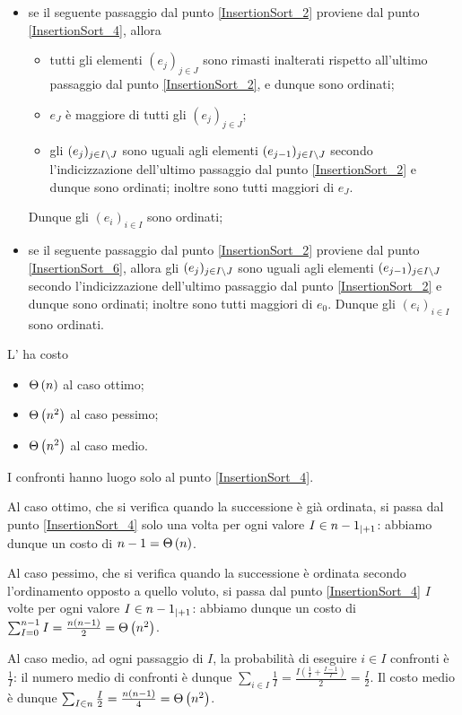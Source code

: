 \begin{itemize}
	\item se il seguente passaggio dal punto \ref{InsertionSort_2} proviene dal
    punto \ref{InsertionSort_4}, allora
	\begin{itemize}
		\item tutti gli elementi $(e_j)_{j \in J}$ sono rimasti inalterati rispetto
      all'ultimo passaggio dal punto \ref{InsertionSort_2}, e dunque sono
      ordinati;
		\item $e_J$ \`e maggiore di tutti gli $(e_j)_{j \in J}$;
		\item gli $(e_j)_{j \in I \setminus J}$ sono uguali agli elementi
      $(e_{j - 1})_{j \in I \setminus J}$ secondo l'indicizzazione dell'ultimo
      passaggio dal punto \ref{InsertionSort_2} e dunque sono ordinati; inoltre
      sono tutti maggiori di $e_J$.
	\end{itemize}
	Dunque gli $(e_i)_{i \in I}$ sono ordinati;
	\item se il seguente passaggio dal punto \ref{InsertionSort_2} proviene dal
    punto \ref{InsertionSort_6}, allora gli $(e_j)_{j \in I \setminus J}$ sono
    uguali agli elementi $(e_{j - 1})_{j \in I \setminus J}$ secondo
    l'indicizzazione dell'ultimo passaggio dal punto \ref{InsertionSort_2} e
    dunque sono ordinati; inoltre sono tutti maggiori di $e_0$. Dunque gli
    $(e_i)_{i \in I}$ sono ordinati. \EndProof
\end{itemize}
\begin{Theorem}
	L' ha costo
	\begin{itemize}
		\item $\Theta \left ( n \right )$ al caso ottimo;
		\item $\Theta \left ( n^2 \right )$ al caso pessimo;
		\item $\Theta \left ( n^2 \right )$ al caso medio.
	\end{itemize}
\end{Theorem}
\Proof I confronti hanno luogo solo al punto \ref{InsertionSort_4}.
\par Al caso ottimo, che si verifica quando la successione \`e gi\`a ordinata,
si passa dal punto \ref{InsertionSort_4} solo una volta per ogni valore
$I \in {n - 1}_{|+ 1}$: abbiamo dunque un costo di $n - 1 = \Theta \left ( n \right )$.
\par Al caso pessimo, che si verifica quando la successione \`e ordinata secondo
l'ordinamento opposto a quello voluto, si passa dal punto \ref{InsertionSort_4}
$I$ volte per ogni valore $I \in {n - 1}_{|+ 1}$: abbiamo dunque un costo
di $\sum_{I = 0}^{n - 1} I = \frac{n(n - 1)}{2} = \Theta \left ( n^2 \right )$.
\par Al caso medio, ad ogni passaggio di $I$, la probabilit\`a di eseguire
$i \in I$ confronti \`e $\frac{1}{I}$: il numero medio di confronti \`e dunque
$\sum_{i \in I} \frac{1}{I}
= \frac{I\left (\frac{1}{I} + \frac{I - 1}{I} \right )}{2}
= \frac{I}{2}$.
Il costo medio \`e dunque
$\sum_{I \in n} \frac{I}{2}
= \frac{n(n - 1)}{4} = \Theta \left ( n^2 \right )$. \EndProof
